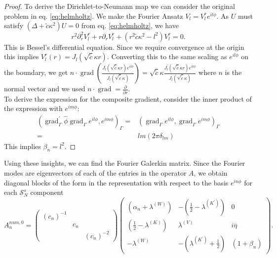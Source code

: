 \documentclass[12pt,journal,compsoc, onecolumn]{IEEEtran}
\begin{document}
\begin{proof}
    To derive the Dirichlet-to-Neumann map we can consider the original problem in eq. \ref{eq:helmholtz}. 
    We make the Fourier Ansatz $V_l = V^r_l e^{i l \phi}$. As $U$ must satisfy  $(\Delta + \tilde c\kappa^2) U = 0$ from eq. \ref{eq:helmholtz}, 
we have 
$$
r^2 \partial_r^2V_l^r + r \partial_r V_l^r + (r^2  \tilde c \kappa^2 - l^2)V^r_l = 0.
$$
This is Bessel's differential equation. Since we require convergence at the origin this implies $V^r_l(r) = J_l(\sqrt{\tilde c}\kappa r)$. Converting this to the same scaling as $e^{il\phi}$ on the boundary, we get $n\cdot \operatorname{grad} \left(\frac{J_l(\sqrt{\tilde c}\kappa r)  e^{i l \phi}}{J_l(\sqrt{\tilde c}\kappa)}\right) = \sqrt{\tilde c}\kappa \frac{J_l^\prime(\sqrt{\tilde c}\kappa r)  e^{i l \phi}}{J_l(\sqrt{\tilde c}\kappa)}$  where $n$ is the normal vector and we used $n\cdot \operatorname{grad} = \frac{\partial}{\partial r}$. \\
To derive the expression for the composite gradient, consider the inner product of the expression with $e^{im\phi}$: 
\begin{align}
    (\operatorname{grad}_{\Gamma}^{\prime} \hat{\phi} \operatorname{grad}_{\Gamma}  e^{il\phi}, e^{im\phi})_\Gamma =&  (  \operatorname{grad}_{\Gamma}  e^{il\phi}, \operatorname{grad}_{\Gamma}e^{im\phi})_\Gamma \nonumber \\ =&  lm (2\pi \delta_{lm}) \nonumber
\end{align}
This implies $\beta_n = l^2$.
\end{proof}  \noindent
Using these insights, we can find the Fourier Galerkin matrix. 
Since the Fourier modes are eigenvectors of each of the entries in the operator $A$, we obtain diagonal blocks of the form in the representation with respect to the basis $e^{i n \phi}$ for each $\mathcal{S}_N^{s}$ component
$$
A^{num, 0}_n =
\begin{pmatrix}
    (c_n)^{-1} & & \\ & c_n & \\  & & (c_n)^{-2}
\end{pmatrix}\begin{pmatrix}
    (\alpha_n + \lambda^{(W)}) & - (\frac{1}{2} - \lambda^{(K^\prime)}) & 0 \\
    (\frac{1}{2} -  \lambda^{(K)}) &  \lambda^{(V)} & i \overline{\eta} \\ 
    -  \lambda^{(W)} & - ( \lambda^{(K^\prime)} + \frac{1}{2}) & (1 + \beta_n)
\end{pmatrix}.
$$
\end{document}
